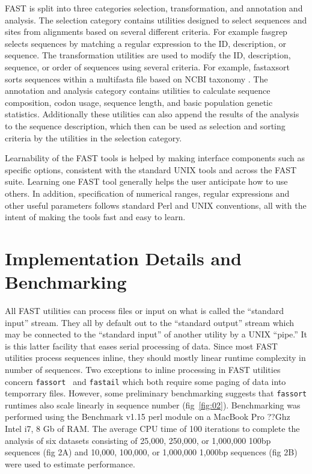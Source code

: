 \documentclass{frontiersSCNS} %
\begin{document}
FAST is split into three categories selection, transformation, and
annotation and analysis. The selection category contains utilities
designed to select sequences and sites from alignments based on
several different criteria. For example fasgrep selects sequences by
matching a regular expression to the ID, description, or sequence. The
transformation utilities are used to modify the ID, description,
sequence, or order of sequences using several criteria. For example,
fastaxsort sorts sequences within a multifasta file based on NCBI
taxonomy \citep{Benson2009, Sayers2009}. The annotation and analysis
category contains utilities to calculate sequence composition, codon
usage, sequence length, and basic population genetic
statistics. Additionally these utilities can also append the results
of the analysis to the sequence description, which then can be used as
selection and sorting criteria by the utilities in the selection
category.

Learnability of the FAST tools is helped by making interface
components such as specific options, consistent with the standard UNIX
tools and across the FAST suite. Learning one FAST tool generally
helps the user anticipate how to use others. In addition,
specification of numerical ranges, regular expressions and other
useful parameters follows standard Perl and UNIX conventions, all with
the intent of making the tools fast and easy to learn.

\section{Implementation Details and Benchmarking}

All FAST utilities can process files or input on what is called the
``standard input'' stream. They all by default out to the ``standard
output'' stream which may be connected to the ``standard input'' of
another utility by a UNIX ``pipe.'' It is this latter facility that
eases serial processing of data. Since most FAST utilities process
sequences inline, they should mostly linear runtime complexity in
number of sequences. Two exceptions to inline processing in FAST
utilities concern {\tt fassort } and {\tt fastail} which both require
some paging of data into temporrary files. However, some preliminary
benchmarking suggests that {\tt fassort} runtimes also scale linearly in
sequence number (fig~\ref{fig:02}). Benchmarking was performed using
the Benchmark v1.15 perl module on a MacBook Pro ??Ghz Intel
i7, 8 Gb of RAM. The average CPU time of 100 iterations to complete
the analysis of six datasets consisting of 25,000, 250,000, or
1,000,000 100bp sequences (fig 2A) and 10,000, 100,000, or 1,000,000 1,000bp sequences (fig 2B) were used to estimate performance.  
\end{document}
